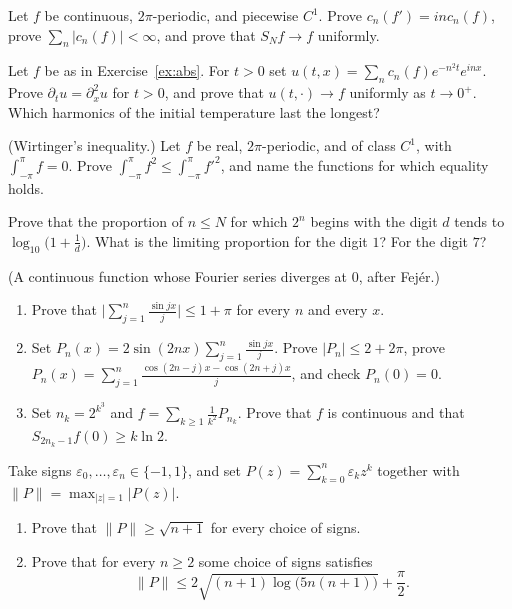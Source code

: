 \begin{exercise}[$\star\star$]\label{ex:abs}
Let $f$ be continuous, $2\pi$-periodic, and piecewise $C^1$. Prove $c_n(f')=inc_n(f)$, prove $\sum_n|c_n(f)|<\infty$, and prove that $S_Nf\to f$ uniformly.
\end{exercise}

\begin{exercise}[$\star\star$]\label{ex:heat}
Let $f$ be as in Exercise~\ref{ex:abs}. For $t>0$ set $u(t,x)=\sum_nc_n(f)e^{-n^2t}e^{inx}$. Prove $\partial_tu=\partial_x^2u$ for $t>0$, and prove that $u(t,\cdot)\to f$ uniformly as $t\to0^+$. Which harmonics of the initial temperature last the longest?
\end{exercise}

\begin{exercise}[$\star\star$]\label{ex:wirtinger}
(Wirtinger's inequality.) Let $f$ be real, $2\pi$-periodic, and of class $C^1$, with $\int_{-\pi}^\pi f=0$. Prove $\int_{-\pi}^\pi f^2\le\int_{-\pi}^\pi f'^2$, and name the functions for which equality holds.
\end{exercise}

\begin{exercise}[$\star\star$]\label{ex:benford}
Prove that the proportion of $n\le N$ for which $2^n$ begins with the digit $d$ tends to $\log_{10}\bigl(1+\frac1d\bigr)$. What is the limiting proportion for the digit $1$? For the digit $7$?
\end{exercise}

\begin{exercise}[$\star\star\star$]\label{ex:divergent}
(A continuous function whose Fourier series diverges at $0$, after Fej\'er.)
\begin{enumerate}[label=(\alph*)]
\item Prove that $\bigl|\sum_{j=1}^n\frac{\sin jx}j\bigr|\le1+\pi$ for every $n$ and every $x$.
\item Set $P_n(x)=2\sin(2nx)\sum_{j=1}^n\frac{\sin jx}j$. Prove $|P_n|\le2+2\pi$, prove $P_n(x)=\sum_{j=1}^n\frac{\cos(2n-j)x-\cos(2n+j)x}j$, and check $P_n(0)=0$.
\item Set $n_k=2^{k^3}$ and $f=\sum_{k\ge1}\frac1{k^2}P_{n_k}$. Prove that $f$ is continuous and that $S_{2n_k-1}f(0)\ge k\ln2$.
\end{enumerate}
\end{exercise}

\begin{exercise}[$\star\star\star$]\label{pb:flat}
Take signs $\varepsilon_0,\dots,\varepsilon_n\in\{-1,1\}$, and set $P(z)=\sum_{k=0}^n\varepsilon_kz^k$ together with $\|P\|=\max_{|z|=1}|P(z)|$.
\begin{enumerate}[label=(\alph*)]
\item Prove that $\|P\|\ge\sqrt{n+1}$ for every choice of signs.
\item Prove that for every $n\ge2$ some choice of signs satisfies
\[
\|P\|\le2\sqrt{(n+1)\log\bigl(5n(n+1)\bigr)}+\frac\pi2.
\]
\end{enumerate}
\end{exercise}

